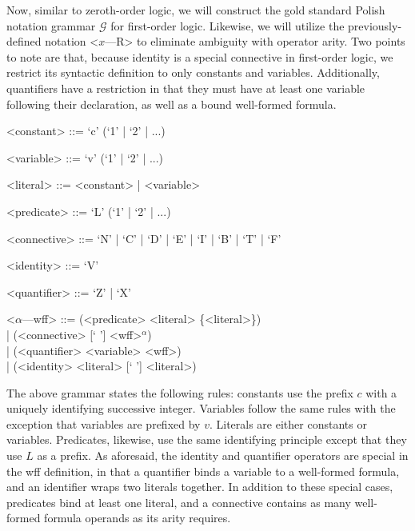 \documentclass[ms]{uncgdissertationexp2}
\theoremstyle{plain}
\theoremstyle{definition}
\theoremstyle{remark}
\begin{document}
Now, similar to zeroth-order logic, we will construct the gold standard Polish notation grammar $\mathcal{G}$ for first-order logic. Likewise, we will utilize the previously-defined notation \textless{$x$---R\textgreater} to eliminate ambiguity with operator arity. Two points to note are that, because identity is a special connective in first-order logic, we restrict its syntactic definition to only constants and variables. Additionally, quantifiers have a restriction in that they must have at least one variable following their declaration, as well as a bound well-formed formula.
\begin{grammar}
	<constant> ::= `c' (`1' | `2' | ...)
	
	<variable> ::= `v' (`1' | `2' | ...)
	
	<literal> ::= <constant> | <variable>
	
	<predicate> ::= `L' (`1' | `2' | ...)
	
	<connective> ::= `N' | `C' | `D' | `E' | `I' | `B' | `T' | `F'
	
	<identity> ::= `V'
	
	<quantifier> ::= `Z' | `X'
	
	<$\alpha$---wff> ::= (<predicate> <literal> \{<literal>\}) \\| (<connective> [` '] <wff>$^{\alpha}$) \\| (<quantifier> <variable> <wff>)\\| (<identity> <literal> [` '] <literal>)
\end{grammar}
The above grammar states the following rules: constants use the prefix $c$ with a uniquely identifying successive integer. Variables follow the same rules with the exception that variables are prefixed by $v$. Literals are either constants or variables. Predicates, likewise, use the same identifying principle except that they use $L$ as a prefix. As aforesaid, the identity and quantifier operators are special in the wff definition, in that a quantifier binds a variable to a well-formed formula, and an identifier wraps two literals together. In addition to these special cases, predicates bind at least one literal, and a connective contains as many well-formed formula operands as its arity requires.  
\end{document}
